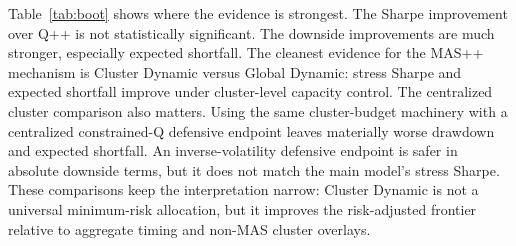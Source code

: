 \documentclass[sigconf,nonacm]{acmart}
\begin{document}
\begin{table}[t]
\centering
\caption{Bootstrap inference for Cluster Dynamic Governor. Positive drawdown and ES5 differences mean the first strategy has smaller drawdown or less negative expected shortfall.}
\label{tab:boot}
\tiny
\setlength{\tabcolsep}{2.0pt}
\end{table}

Table~\ref{tab:boot} shows where the evidence is strongest. The Sharpe improvement over Q++ is not statistically significant. The downside improvements are much stronger, especially expected shortfall. The cleanest evidence for the MAS++ mechanism is Cluster Dynamic versus Global Dynamic: stress Sharpe and expected shortfall improve under cluster-level capacity control. The centralized cluster comparison also matters. Using the same cluster-budget machinery with a centralized constrained-Q defensive endpoint leaves materially worse drawdown and expected shortfall. An inverse-volatility defensive endpoint is safer in absolute downside terms, but it does not match the main model's stress Sharpe. These comparisons keep the interpretation narrow: Cluster Dynamic is not a universal minimum-risk allocation, but it improves the risk-adjusted frontier relative to aggregate timing and non-MAS cluster overlays.
\end{document}
